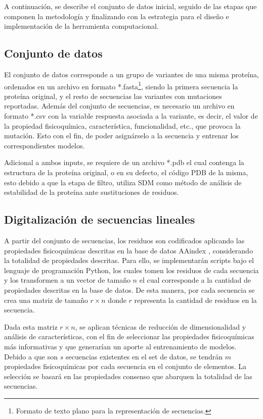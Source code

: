 A continuación, se describe el conjunto de datos inicial, seguido de las etapas que componen la metodología y finalizando con la estrategia para el diseño e implementación de la herramienta computacional.

\subsection{Conjunto de datos}

El conjunto de datos corresponde a un grupo de variantes de una misma proteína, ordenados en un archivo en formato *.fasta\footnote{Formato de texto plano para la representación de secuencias.}, siendo la primera secuencia la proteína original, y el resto de secuencias las variantes con mutaciones reportadas. Además del conjunto de secuencias, es necesario un archivo en formato *.csv con la variable respuesta asociada a la variante, es decir, el valor de la propiedad fisicoquímica, característica, funcionalidad, etc., que provoca la mutación. Esto con el fin, de poder asignárselo a la secuencia y entrenar los correspondientes modelos. 

Adicional a ambos inputs, se requiere de un archivo *.pdb el cual contenga la estructura de la proteína original, o en su defecto, el código PDB de la misma, esto debido a que la etapa de filtro, utiliza SDM como método de análisis de estabilidad de la proteína ante sustituciones de residuos.

\subsection{Digitalización de secuencias lineales}

A partir del conjunto de secuencias, los residuos son codificados aplicando las propiedades fisicoquímicas descritas en la base de datos AAindex \cite{Kawashima2000}, considerando la totalidad de propiedades descritas. Para ello, se implementarán scripts bajo el lenguaje de programación Python, los cuales tomen los residuos de cada secuencia y los transformen a un vector de tamaño $n$ el cual corresponde a la cantidad de propiedades descritas en la base de datos. De esta manera, por cada secuencia se crea una matriz de tamaño $r \times n$ donde $r$ representa la cantidad de residuos en la secuencia.

Dada esta matriz $r \times n$, se aplican técnicas de reducción de dimensionalidad y análisis de características, con el fin de seleccionar las propiedades fisicoquímicas más informativas y que generarían un aporte al entrenamiento de modelos. Debido a que son $s$ secuencias existentes en el set de datos, se tendrán $m$ propiedades fisicoquímicas por cada secuencia en el conjunto de elementos. La selección se basará en las propiedades consenso que abarquen la totalidad de las secuencias. 

